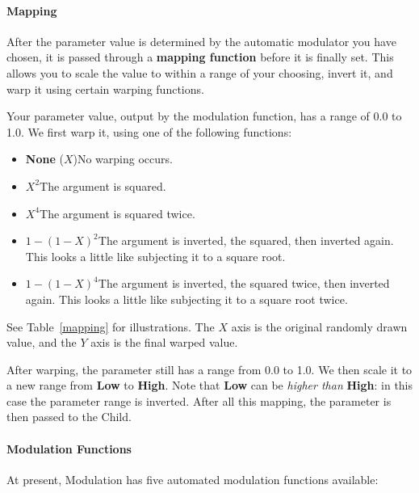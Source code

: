 \documentclass[twoside,10pt]{article}
\begin{document}
\paragraph{Mapping}

After the parameter value is determined by the automatic modulator you have chosen, it is passed through a {\bf mapping function} before it is finally set.  This allows you to scale the value to within a range of your choosing, invert it, and warp it using certain warping functions.

Your parameter value, output by the modulation function, has a range of 0.0 to 1.0.  We first warp it, using one of the following functions:

\begin{itemize}
\item {\bf None} (\(X\))\qquad No warping occurs.
\item \(X^2\)\qquad The argument is squared.
\item \(X^4\)\qquad The argument is squared twice.
\item \(1-(1-X)^2\)\qquad The argument is inverted, the squared, then inverted again.  This looks a little like subjecting it to a square root.
\item \(1-(1-X)^4\)\qquad The argument is inverted, the squared twice, then inverted again.  This looks a little like subjecting it to a square root twice.
\end{itemize}

See Table~\ref{mapping} for illustrations.  The \(X\) axis is the original randomly drawn value, and the \(Y\) axis is the final warped value.  

After warping, the parameter still has a range from 0.0 to 1.0.  We then scale it to a new range from {\bf Low} to {\bf High}.  Note that {\bf Low} can be {\it higher than} {\bf High}: in this case the parameter range is inverted.  After all this mapping, the parameter is then passed to the Child.

\paragraph{Modulation Functions}

At present, Modulation has five automated modulation functions available:
\end{document}
